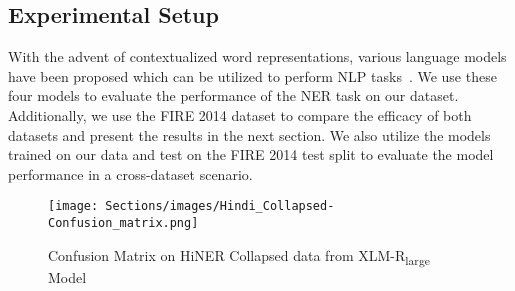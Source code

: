 \documentclass[10pt, a4paper]{article}
\begin{document}
\begin{table*}[!h]
\centering
{}
\caption{Test Set F1-Score of various pre-trained LMs on our HiNER dataset (Collapsed). This table reports a mean F1-score and its standard deviation over 5 runs.}
\label{tab:collapsedResultsOurDatasetLabel}
\end{table*}

\subsection{Experimental Setup}

With the advent of contextualized word representations, various language models have been proposed which can be utilized to perform NLP tasks~\cite{devlin2018bert,conneau-etal-2020-unsupervised,kakwani2020inlpsuite,khanuja2021muril}. We use these four models to evaluate the performance of the NER task on our dataset. Additionally, we use the FIRE 2014 dataset to compare the efficacy of both datasets and present the results in the next section. We also utilize the models trained on our data and test on the FIRE 2014 test split to evaluate the model performance in a cross-dataset scenario. 

\begin{figure}[!htb]
    \texttt{[image: Sections/images/Hindi\_Collapsed-Confusion\_matrix.png]}
    \caption{Confusion Matrix on HiNER Collapsed data from XLM-R\textsubscript{large} Model}
    \label{fig:confusionHiNERCollapsed}
\end{figure}
\end{document}
